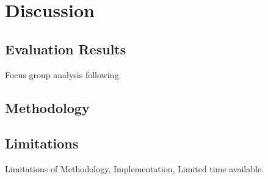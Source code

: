 \section{Discussion}
\label{chap:discussion}

\subsection{Evaluation Results}

Focus group analysis following \cite{asbury1995overview}

\subsection{Methodology}

\subsection{Limitations}

Limitations of Methodology, Implementation, Limited time available.


